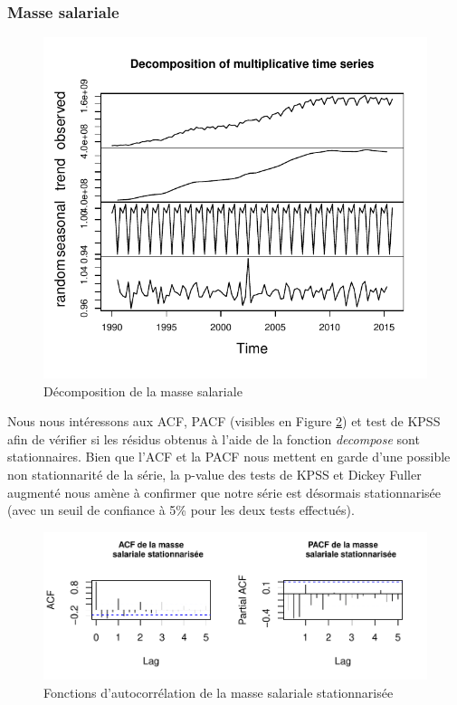 \documentclass[11pt,]{article}
\begin{document}
\subsubsection{Masse salariale}\label{masse-salariale-1}

\begin{figure}[htbp]
\centering
\includegraphics{Rapport_final_files/figure-latex/unnamed-chunk-12-1.pdf}
\caption{\label{fig10} Décomposition de la masse salariale}
\end{figure}

Nous nous intéressons aux ACF, PACF (visibles en Figure \ref{fig11}) et
test de KPSS afin de vérifier si les résidus obtenus à l'aide de la
fonction \emph{decompose} sont stationnaires. Bien que l'ACF et la PACF
nous mettent en garde d'une possible non stationnarité de la série, la
p-value des tests de KPSS et Dickey Fuller augmenté nous amène à
confirmer que notre série est désormais stationnarisée (avec un seuil de
confiance à 5\% pour les deux tests effectués).

\begin{figure}[htbp]
\centering
\includegraphics{Rapport_final_files/figure-latex/unnamed-chunk-13-1.pdf}
\caption{\label{fig11} Fonctions d'autocorrélation de la masse salariale
stationnarisée}
\end{figure}
\end{document}
